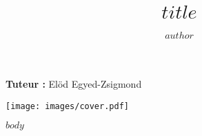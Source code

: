 \documentclass[a4paper,11pt]{article}
\title{$title$}
\author{$author$}
\date{}
\begin{document}
\maketitle
\begin{center}
\textbf{Tuteur :} Elöd Egyed-Zsigmond
\end{center}
\vspace{2cm}
\begin{center}
\texttt{[image: images/cover.pdf]}
\end{center}
{
  \footnotesize
  \tableofcontents
}
\newpage

\onehalfspacing

$body$
\end{document}
